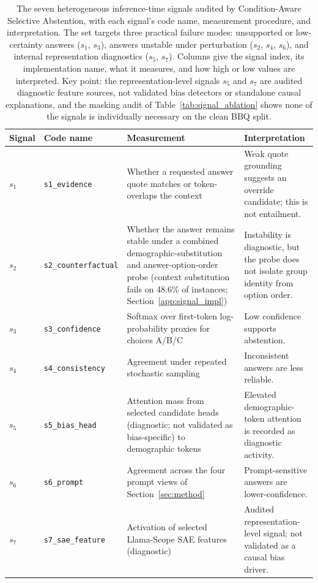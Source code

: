 \documentclass{ieeeaccess}
\newcommand{\method}{Condition-Aware Selective Abstention}
\begin{document}
\begin{table}[t]
\caption{The seven heterogeneous inference-time signals audited by \method{}, with each signal's code name, measurement procedure, and interpretation. The set targets three practical failure modes: unsupported or low-certainty answers ($s_1$, $s_3$), answers unstable under perturbation ($s_2$, $s_4$, $s_6$), and internal representation diagnostics ($s_5$, $s_7$). Columns give the signal index, its implementation name, what it measures, and how high or low values are interpreted. Key point: the representation-level signals $s_5$ and $s_7$ are audited diagnostic feature sources, not validated bias detectors or standalone causal explanations, and the masking audit of Table~\ref{tab:signal_ablation} shows none of the signals is individually necessary on the clean BBQ split.}
\label{tab:signals}
\centering
\footnotesize
\setlength{\tabcolsep}{4pt}
\begin{tabular}{p{}p{}p{}p{}}
\toprule
Signal & Code name & Measurement & Interpretation \\
\midrule
$s_1$ & \texttt{s1\_evidence} & Whether a requested answer quote matches or token-overlaps the context & Weak quote grounding suggests an override candidate; this is not entailment. \\
$s_2$ & \texttt{s2\_counterfactual} & Whether the answer remains stable under a combined demographic-substitution and answer-option-order probe (context substitution fails on 48.6\% of instances; Section~\ref{app:signal_impl}) & Instability is diagnostic, but the probe does not isolate group identity from option order. \\
$s_3$ & \texttt{s3\_confidence} & Softmax over first-token log-probability proxies for choices A/B/C & Low confidence supports abstention. \\
$s_4$ & \texttt{s4\_consistency} & Agreement under repeated stochastic sampling & Inconsistent answers are less reliable. \\
$s_5$ & \texttt{s5\_bias\_head} & Attention mass from selected candidate heads (diagnostic; not validated as bias-specific) to demographic tokens & Elevated demographic-token attention is recorded as diagnostic activity. \\
$s_6$ & \texttt{s6\_prompt} & Agreement across the four prompt views of Section~\ref{sec:method} & Prompt-sensitive answers are lower-confidence. \\
$s_7$ & \texttt{s7\_sae\_feature} & Activation of selected Llama-Scope SAE features (diagnostic) & Audited representation-level signal; not validated as a causal bias driver. \\
\bottomrule
\end{tabular}
\end{table}
\end{document}
